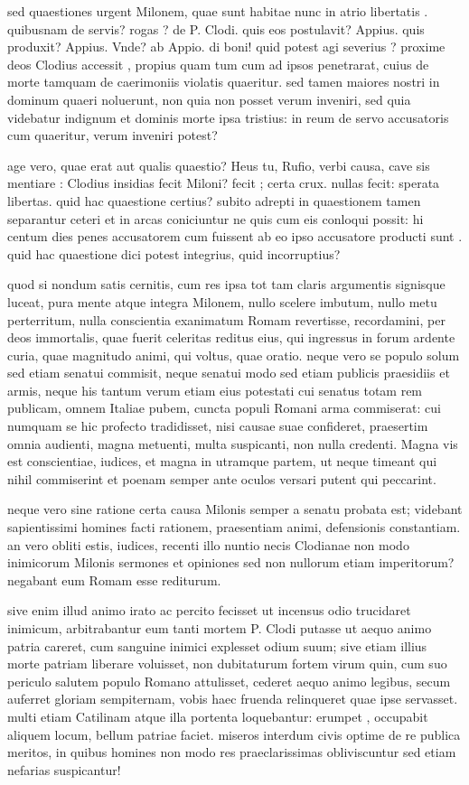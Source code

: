  sed quaestiones urgent Milonem, quae sunt habitae nunc in atrio libertatis . quibusnam de servis? rogas ? de P. Clodi. quis eos postulavit? Appius. quis produxit? Appius. Vnde? ab Appio. di boni! quid potest agi severius ? proxime deos Clodius accessit , propius quam tum cum ad ipsos penetrarat, cuius de morte tamquam de caerimoniis violatis quaeritur. sed tamen maiores nostri in dominum quaeri noluerunt, non quia non posset verum inveniri, sed quia videbatur indignum et dominis morte ipsa tristius: in reum de servo accusatoris cum quaeritur, verum inveniri potest?

 age vero, quae erat aut qualis quaestio? Heus tu, Rufio, verbi causa, cave sis mentiare : Clodius insidias fecit Miloni? fecit ; certa crux. nullas fecit: sperata libertas. quid hac quaestione certius? subito adrepti in quaestionem tamen separantur ceteri et in arcas coniciuntur ne quis cum eis conloqui possit: hi centum dies penes accusatorem cum fuissent ab eo ipso accusatore producti sunt . quid hac quaestione dici potest integrius, quid incorruptius?

 quod si nondum satis cernitis, cum res ipsa tot tam claris argumentis signisque luceat, pura mente atque integra Milonem, nullo scelere imbutum, nullo metu perterritum, nulla conscientia exanimatum Romam revertisse, recordamini, per deos immortalis, quae fuerit celeritas reditus eius, qui ingressus in forum ardente curia, quae magnitudo animi, qui voltus, quae oratio. neque vero se populo solum sed etiam senatui commisit, neque senatui modo sed etiam publicis praesidiis et armis, neque his tantum verum etiam eius potestati cui senatus totam rem publicam, omnem Italiae pubem, cuncta populi Romani arma commiserat: cui numquam se hic profecto tradidisset, nisi causae suae confideret, praesertim omnia audienti, magna metuenti, multa suspicanti, non nulla credenti. Magna vis est conscientiae, iudices, et magna in utramque partem, ut neque timeant qui nihil commiserint et poenam semper ante oculos versari putent qui peccarint.

 neque vero sine ratione certa causa Milonis semper a senatu probata est; videbant sapientissimi homines facti rationem, praesentiam animi, defensionis constantiam. an vero obliti estis, iudices, recenti illo nuntio necis Clodianae non modo inimicorum Milonis sermones et opiniones sed non nullorum etiam imperitorum? negabant eum Romam esse rediturum.

 sive enim illud animo irato ac percito fecisset ut incensus odio trucidaret inimicum, arbitrabantur eum tanti mortem P. Clodi putasse ut aequo animo patria careret, cum sanguine inimici explesset odium suum; sive etiam illius morte patriam liberare voluisset, non dubitaturum fortem virum quin, cum suo periculo salutem populo Romano attulisset, cederet aequo animo legibus, secum auferret gloriam sempiternam, vobis haec fruenda relinqueret quae ipse servasset. multi etiam Catilinam atque illa portenta loquebantur: erumpet , occupabit aliquem locum, bellum patriae faciet. miseros interdum civis optime de re publica meritos, in quibus homines non modo res praeclarissimas obliviscuntur sed etiam nefarias suspicantur!


